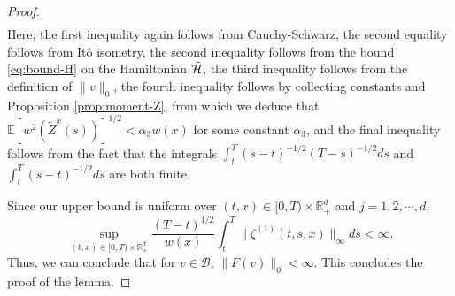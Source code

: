 \documentclass[11pt]{article}
\theoremstyle{definition}
\theoremstyle{plain}
\newcommand{\R}{\mathbb{R}}
\newcommand{\E}{\mathbb{E}}
\newcommand{\cH}{{\cal H}}
\begin{document}
\begin{appendices}
\begin{proof}
\begin{align*}
\end{align*}
Here, the first inequality again follows from Cauchy-Schwarz, the second equality follows from Itô isometry, 
the second inequality follows from the bound \eqref{eq:bound-H} on the Hamiltonian $\tilde \cH$, 
the third inequality follows from the definition of $\|v\|_0$, 
the fourth inequality follows by collecting constants and Proposition \ref{prop:moment-Z}, 
from which we deduce that $\E\left[w^2(\tilde Z^x(s))\right]^{1/2} < \alpha_3 w(x)$ for some constant $\alpha_3$, 
and the final inequality follows from the fact that the integrals $\int_t^T (s - t)^{-1/2} (T - s)^{-1/2} ds$ 
and $\int_t^T (s - t)^{-1/2} ds$ are both finite. 

Since our upper bound is uniform over $(t,x) \in [0, T) \times \R_+^d$ and $j = 1, 2, \cdots, d$, 
\[
\sup_{(t,x) \in [0,T) \times \mathbb{R}_+^d} \frac{(T - t)^{1/2}}{w(x)} \int_t^T \|\zeta^{(1)}(t,s,x)\|_\infty ds < \infty.
\]
Thus, we can conclude that for \( v \in \mathcal{B} \),  
$\|F(v)\|_0 < \infty$. This concludes the proof of the lemma. 
\end{proof}


\end{appendices}
\end{document}
